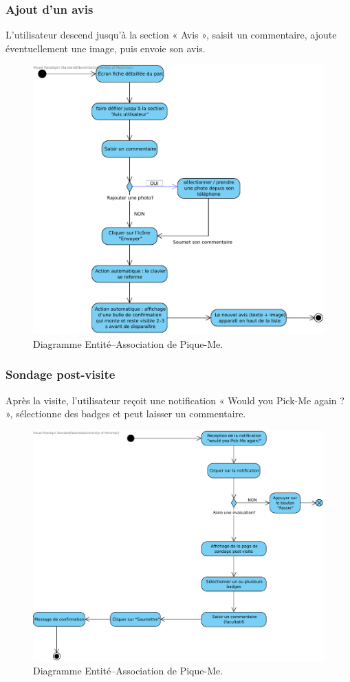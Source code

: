 \documentclass[12pt,a4paper]{article}
\begin{document}
\subsubsection{Ajout d'un avis}

L'utilisateur descend jusqu'à la section « Avis », saisit un commentaire, ajoute éventuellement une image, puis envoie son avis.

\begin{figure}[h!]
  \centering
  \includegraphics[width=0.9\linewidth]{attachments/Ajouter_un_avis_spot.pdf}
  \caption{Diagramme Entité–Association de Pique-Me.}
\end{figure}

\subsubsection{Sondage post-visite}

Après la visite, l'utilisateur reçoit une notification « Would you Pick-Me again ? », sélectionne des badges et peut laisser un commentaire.

\begin{figure}[h!]
  \centering
  \includegraphics[width=0.9\linewidth]{attachments/Sondage_post_visite.pdf}
  \caption{Diagramme Entité–Association de Pique-Me.}
\end{figure}
\end{document}

